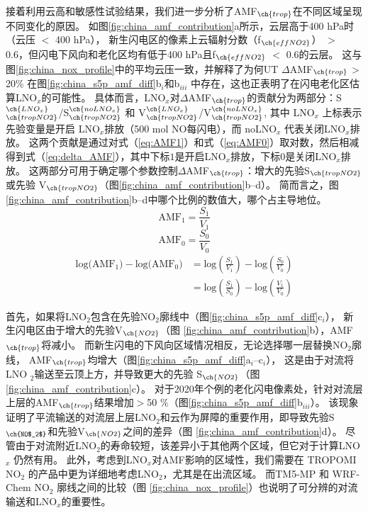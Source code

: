接着利用云高和敏感性试验结果，我们进一步分析了AMF$_{\ch{trop}}$在不同区域呈现不同变化的原因。
如图\ref{fig:china_amf_contribution}a所示，云层高于400 hPa时（云压 $<$ 400 hPa），
新生闪电区的像素上云辐射分数（f$_{\ch{effNO2}}$） $>$ 0.6，但闪电下风向和老化区均有低于400 hPa且f$_{\ch{effNO2}}$ $<$ 0.6的云层。
这与图\ref{fig:china_nox_profile}中的平均云压一致，并解释了为何UT $\Delta$AMF$_{\ch{trop}}$ > 20\% 在图\ref{fig:china_s5p_amf_diff}b$_i$和b$_{iii}$ 中存在，这也正表明了在闪电老化区估算LNO$_x$的可能性。
具体而言，LNO$_x$对$\Delta$AMF$_{\ch{trop}}$的贡献分为两部分：S$^{\ch{LNO_x}}_{\ch{tropNO2}}$/S$^{\ch{noLNO_x}}_{\ch{tropNO2}}$ 和 V$^{\ch{LNO_x}}_{\ch{tropNO2}}$/V$^{\ch{noLNO_x}}_{\ch{tropNO2}}$,
其中 LNO$_x$ 上标表示先验变量是开启 LNO$_x$排放（500 mol NO每闪电），而 noLNO$_x$ 代表关闭LNO$_x$排放。
这两个贡献是通过对式（\ref{eq:AMF1}）和式（\ref{eq:AMF0}）取对数，然后相减得到式（\ref{eq:delta_AMF}），其中下标$1$是开启LNO$_x$排放，下标$0$是关闭LNO$_x$排放。
这两部分可用于确定哪个参数控制$\Delta$AMF$_{\ch{trop}}$：增大的先验S$_{\ch{tropNO2}}$ 或先验 V$_{\ch{tropNO2}}$（图\ref{fig:china_amf_contribution}b--d）。
简而言之，图\ref{fig:china_amf_contribution}b--d中哪个比例的数值大，哪个占主导地位。
{
\abovedisplayskip=5pt%
\belowdisplayskip=5pt%
\begin{equation} \label{eq:AMF1}
\textrm{AMF}_1 = \frac{S_1}{V_1}
\end{equation}
\begin{equation} \label{eq:AMF0}
\textrm{AMF}_0 = \frac{S_0}{V_0}
\end{equation}
\begin{equation} \label{eq:delta_AMF}
\begin{split}
\textrm{log(AMF$_1$)} - \textrm{log(AMF$_0$)} & = \textrm{log}(\frac{S_1}{V_1}) - \textrm{log}(\frac{S_0}{V_0}) \\
                                              & = \textrm{log}(\frac{S_1}{S_0}) - \textrm{log}(\frac{V_1}{V_0})
\end{split}
\end{equation}
}

首先，如果将LNO$_2$包含在先验NO$_2$廓线中（图\ref{fig:china_s5p_amf_diff}c$_i$），
新生闪电区由于增大的先验V$_{\ch{NO2}}$（图 \ref{fig:china_amf_contribution}b），AMF$_{\ch{trop}}$将减小。
而新生闪电的下风向区域情况相反，无论选择哪一层替换NO$_2$廓线，
AMF$_{\ch{trop}}$均增大（图\ref{fig:china_s5p_amf_diff}a$_{i}$--c$_{i}$），
这是由于对流将LNO $_2$输送至云顶上方，并导致更大的先验 S$_{\ch{NO2}}$（图 \ref{fig:china_amf_contribution}c）。
对于2020年个例的老化闪电像素处，针对对流层上层的AMF$_{\ch{trop}}$结果增加$>$50 \%（图\ref{fig:china_s5p_amf_diff}b$_{iii}$）。
该现象证明了平流输送的对流层上层LNO$_2$和云作为屏障的重要作用，即导致先验S$_{\ch{NO$_2$}}$和先验V$_{\ch{NO2}}$之间的差异（图 \ref{fig:china_amf_contribution}d）。
尽管由于对流附近LNO$_2$的寿命较短，该差异小于其他两个区域，但它对于计算LNO$_x$ 仍然有用。
此外，考虑到LNO$_x$对AMF影响的区域性，我们需要在 TROPOMI NO$_2$ 的产品中更为详细地考虑LNO$_2$，尤其是在出流区域。
而TM5-MP 和 WRF-Chem NO$_2$ 廓线之间的比较（图 \ref{fig:china_nox_profile}）也说明了可分辨的对流输送和LNO$_x$的重要性。



